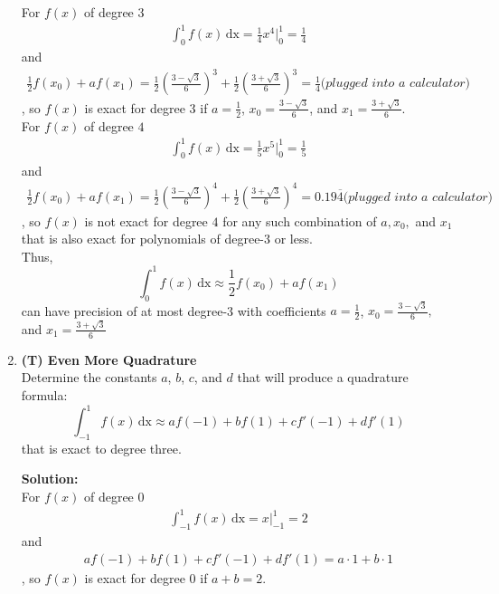 \documentclass[12pt]{article}
\begin{document}
\begin{enumerate}[label=\bfseries Problem \arabic*:]
For $f(x)$ of degree $3$
\begin{align*}
    \int_0^1 f(x) \, \text{dx}=\frac{1}{4}x^4|_{0}^{1}=\frac{1}{4}
\end{align*}
and
\begin{align*}
    \frac{1}{2} f(x_0) + a f(x_1) = \frac{1}{2}(\frac{3-\sqrt{3}}{6})^3 + \frac{1}{2}(\frac{3+\sqrt{3}}{6})^3 = \frac{1}{4} \textit{(plugged into a calculator)}
\end{align*}
, so $f(x)$ is exact for degree $3$ if $a=\frac{1}{2}$, $x_0=\frac{3-\sqrt{3}}{6}$, and $x_1=\frac{3+\sqrt{3}}{6}$.\\

For $f(x)$ of degree $4$
\begin{align*}
    \int_0^1 f(x) \, \text{dx}=\frac{1}{5}x^5|_{0}^{1}=\frac{1}{5}
\end{align*}
and
\begin{align*}
    \frac{1}{2} f(x_0) + a f(x_1) = \frac{1}{2}(\frac{3-\sqrt{3}}{6})^4 + \frac{1}{2}(\frac{3+\sqrt{3}}{6})^4 = 0.19\overline{4} \textit{(plugged into a calculator)}
\end{align*}
, so $f(x)$ is not exact for degree $4$ for any such combination of $a,x_0,$ and $x_1$ that is also exact for polynomials of degree-3 or less.\\

Thus, $$\int_0^1 f(x)\, \text{dx}\approx \frac{1}{2} f(x_0) + a f(x_1) $$ can have precision of at most degree-3 with coefficients $a=\frac{1}{2}$, $x_0=\frac{3-\sqrt{3}}{6},$ and $x_1=\frac{3+\sqrt{3}}{6}$
\newpage 

 \item \textbf{(T) Even More Quadrature}\\
Determine the constants $a$, $b$, $c$, and $d$ that will produce a quadrature formula:
$$\int_{-1}^1 f(x) \,\text{dx} \approx a f(-1) + b f(1)+ c f'(-1)+ d f'(1) $$
that is exact to degree three.



\vspace{1em}
\textbf{Solution:}\\
For $f(x)$ of degree $0$
\begin{align*}
    \int_{-1}^1 f(x) \, \text{dx}=x|_{-1}^{1}=2
\end{align*}
and
\begin{align*}
    a f(-1) + b f(1)+ c f'(-1)+ d f'(1)=a\cdot1+b\cdot1
\end{align*}
, so $f(x)$ is exact for degree $0$ if $a+b=2$.\\


\end{enumerate}
\end{document}
